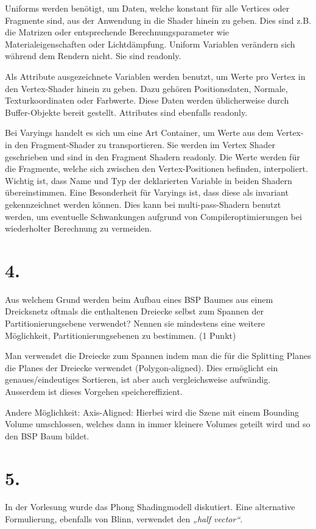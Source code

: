 \documentclass[12pt]{scrreprt}
\begin{document}
Uniforms werden benötigt, um Daten, welche konstant für alle Vertices oder Fragmente sind, aus der Anwendung in die Shader hinein zu geben. Dies sind z.B. die Matrizen oder entsprechende Berechnungsparameter wie Materialeigenschaften oder Lichtdämpfung. Uniform Variablen verändern sich während dem Rendern nicht. Sie sind readonly.


Als Attribute ausgezeichnete Variablen werden benutzt, um Werte pro Vertex in den Vertex-Shader hinein zu geben. Dazu gehören Positionsdaten, Normale, Texturkoordinaten oder Farbwerte. Diese Daten werden üblicherweise durch Buffer-Objekte bereit gestellt. Attributes sind ebenfalls readonly.

Bei Varyings handelt es sich um eine Art Container, um Werte aus dem Vertex- in den Fragment-Shader zu transportieren.
Sie werden im Vertex Shader geschrieben und sind in den Fragment Shadern readonly.
Die Werte werden für die Fragmente, welche sich zwischen den Vertex-Positionen befinden, interpoliert.
Wichtig ist, dass Name und Typ der deklarierten Variable in beiden Shadern übereinstimmen.
Eine Besonderheit für Varyings ist, dass diese als invariant gekennzeichnet werden können.
Dies kann bei multi-pass-Shadern benutzt werden, um eventuelle Schwankungen aufgrund von Compileroptimierungen bei wiederholter Berechnung zu vermeiden.


\section*{4.}
Aus welchem Grund werden beim Aufbau eines BSP Baumes aus einem Dreicksnetz oftmals die enthaltenen Dreiecke selbst zum Spannen der Partitionierungsebene verwendet? Nennen sie mindestens eine weitere Möglichkeit, Partitionierungsebenen zu bestimmen. (1 Punkt)

Man verwendet die Dreiecke zum Spannen indem man die für die Splitting Planes die Planes der Dreiecke verwendet (Polygon-aligned). Dies ermöglicht ein genaues/eindeutiges Sortieren, ist aber auch vergleichsweise aufwändig.
Ausserdem ist dieses Vorgehen speichereffizient.

Andere Möglichkeit: Axis-Aligned: Hierbei wird die Szene mit einem Bounding Volume umschlossen, welches dann in immer kleinere Volumes geteilt wird und so den BSP Baum bildet.

\section*{5.}
In der Vorlesung wurde das Phong Shadingmodell diskutiert. Eine alternative Formulierung, ebenfalls von Blinn, verwendet den \emph{„half vector“}.
\end{document}
